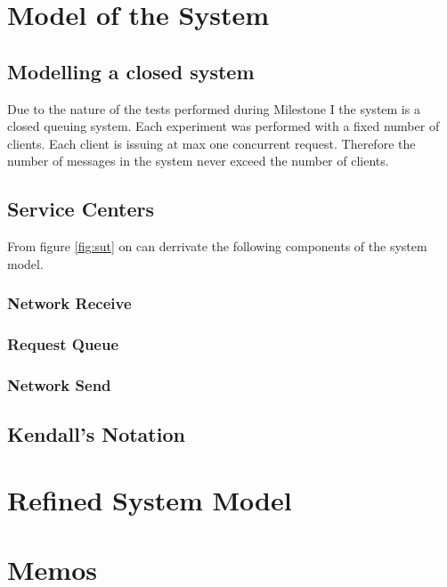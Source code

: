 \documentclass[a4paper]{article}
\begin{document}
\section{Model of the System}

\subsection{Modelling a closed system}
Due to the nature of the tests performed during Milestone I the system is a closed queuing system. Each experiment was performed with a fixed number of clients. Each client is issuing at max one concurrent request. Therefore the number of messages in the system never exceed the number of clients.


\subsection{Service Centers}

From figure \ref{fig:sut} on can derrivate the following components of the system model.

\subsubsection{Network Receive}


\subsubsection{Request Queue}


\subsubsection{Network Send}


\subsection{Kendall's Notation}

\section{Refined System Model}



\section{Memos}
\end{document}
